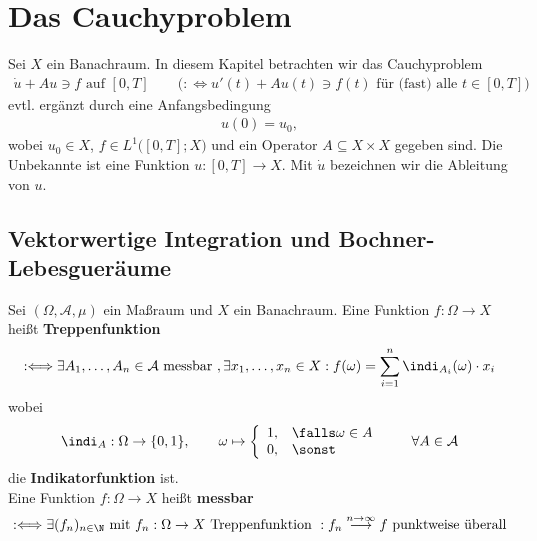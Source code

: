 
\chapter{Das Cauchyproblem}
Sei $X$ ein Banachraum. In diesem Kapitel betrachten wir das Cauchyproblem
\begin{align}\label{CauchyProblem}\tag{CP}
\dot{u}+Au\ni f\text{ auf }[0,T] \qquad\Big(:\Longleftrightarrow u'(t)+A u(t)\ni f(t)\text{ für (fast) alle }t\in[0,T]\Big)
\end{align}
evtl. ergänzt durch eine Anfangsbedingung
\begin{align*}
u(0)=u_0,
\end{align*}
wobei $u_0\in X$, $f\in L^1\big([0,T];X\big)$ und ein Operator $A\subseteq X\times X$ gegeben sind. Die Unbekannte ist eine Funktion $u:[0,T]\to X$. Mit $\dot{u}$ bezeichnen wir die Ableitung von $u$.

\section{Vektorwertige Integration und Bochner-Lebesgueräume}
Sei $(\Omega,\mathcal{A},\mu)$ ein Maßraum und $X$ ein Banachraum. Eine Funktion $f:\Omega\to X$ heißt \textbf{Treppenfunktion}
\begin{align*}
:\Longleftrightarrow\exists A_1,\ldots,A_n\in\mathcal{A}\text{ messbar },\exists x_1,\ldots,x_n\in X:f(\omega)=\sum\limits_{i=1}^n\indi_{A_i}(\omega)\cdot x_i
\end{align*}
wobei
\begin{align*}
\indi_A:\Omega\to\lbrace0,1\rbrace,\qquad\omega\mapsto\left\lbrace\begin{array}{cl}
1, & \falls \omega\in A\\
0, & \sonst
\end{array}\right.\qquad\forall A\in\mathcal{A}
\end{align*}
die \textbf{Indikatorfunktion} ist.\\
Eine Funktion $f:\Omega\to X$ heißt \textbf{messbar}
\begin{align*}
:\Longleftrightarrow\exists(f_n)_{n\in\N}\text{ mit $f_n:\Omega\to X$ Treppenfunktion }:f_n\stackrel{n\to\infty}{\longrightarrow} f\text{ punktweise überall}
\end{align*}

